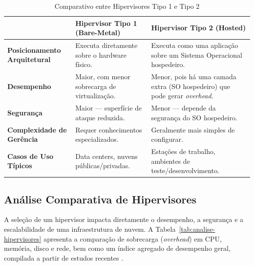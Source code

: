 \begin{table}[htb]
    \centering
    \caption{Comparativo entre Hipervisores Tipo 1 e Tipo 2}
    \label{tab:comparativo_hipervisores}
    \begin{tabularx}{\textwidth}{ >{\bfseries}l >{\RaggedRight}X >{\RaggedRight}X }
        \toprule
        & \textbf{Hipervisor Tipo 1 (Bare-Metal)} & \textbf{Hipervisor Tipo 2 (Hosted)} \\
        \midrule
        Posicionamento Arquitetural & Executa diretamente sobre o hardware físico. & Executa como uma aplicação sobre um Sistema Operacional hospedeiro. \\
        \addlinespace
        Desempenho & Maior, com menor sobrecarga de virtualização. & Menor, pois há uma camada extra (SO hospedeiro) que pode gerar \textit{overhead}. \\
        \addlinespace
        Segurança & Maior — superfície de ataque reduzida. & Menor — depende da segurança do SO hospedeiro. \\
        \addlinespace
        Complexidade de Gerência & Requer conhecimentos especializados. & Geralmente mais simples de configurar. \\
        \addlinespace
        Casos de Uso Típicos & Data centers, nuvens públicas/privadas. & Estações de trabalho, ambientes de teste/desenvolvimento. \\
        \bottomrule
    \end{tabularx}
\end{table}


\subsection{Análise Comparativa de Hipervisores}

A seleção de um hipervisor impacta diretamente o desempenho, a segurança e a escalabilidade de uma infraestrutura de nuvem. A Tabela~\ref{tab:analise-hipervisores} apresenta a comparação de sobrecarga (\textit{overhead}) em CPU, memória, disco e rede, bem como um índice agregado de desempenho geral, compilada a partir de estudos recentes \cite{chawla2025}.

